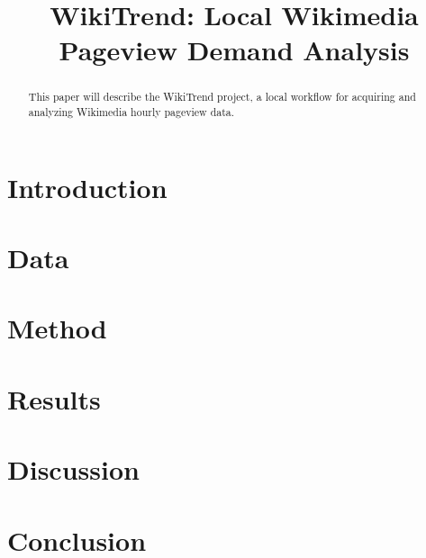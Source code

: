 \documentclass[11pt]{article}
\title{WikiTrend: Local Wikimedia Pageview Demand Analysis}
\author{}
\date{}
\begin{document}
\maketitle

\begin{abstract}
This paper will describe the WikiTrend project, a local workflow for acquiring
and analyzing Wikimedia hourly pageview data.
\end{abstract}


\section{Introduction}

\section{Data}

\section{Method}

\section{Results}

\section{Discussion}

\section{Conclusion}



\end{document}
